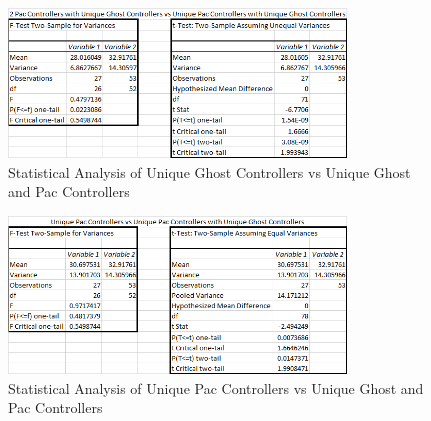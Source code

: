 \documentclass{article}
\begin{document}
\begin{flushleft}
\begin{figure}[h]
	\centering
	\includegraphics[width=0.8\textwidth]{stats2UniqueGhostVsUniquePacAndGhost}
	\caption{Statistical Analysis of Unique Ghost Controllers vs Unique Ghost and Pac Controllers}
\end{figure}

\vspace{15mm}

\begin{figure}[h]
	\centering
	\includegraphics[width=0.8\textwidth]{stats2UniquePacVsUniquePacAndUniqueGhost}
	\caption{Statistical Analysis of Unique Pac Controllers vs Unique Ghost and Pac Controllers}
\end{figure}
\end{flushleft}

\clearpage
\end{document}

